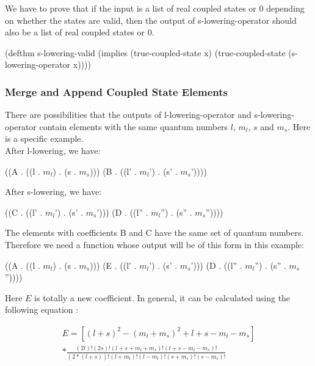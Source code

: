 \documentclass[12pt,journal,compsoc]{IEEEtran}
\begin{document}
We have to prove that if the input is a list of real coupled states or 0 depending on whether the states are valid, then the output of s-lowering-operator should also be a list of real coupled states or 0.

\begin{acl2-lst}
(defthm s-lowering-valid 
 (implies (true-coupled-state x)
  (true-coupled-state (s-lowering-operator x))))
\end{acl2-lst}

\subsubsection{Merge and Append Coupled State Elements}

There are possibilities that the outputs of l-lowering-operator and s-lowering-operator contain elements with the same quantum numbers $l$, $m_l$, $s$ and $m_s$. Here is a specific example.\\

After l-lowering, we have: 

\begin{acl2-lst}
((A . ((l . $m_l$) . (s . $m_s$))) 
(B . ((l' . $m_l$') . (s' . $m_s$'))))
\end{acl2-lst}

After s-lowering, we have:

\begin{acl2-lst}
((C . ((l' . $m_l$') . (s' . $m_s$'))) 
(D . ((l'' . $m_l$'') . (s'' . $m_s$''))))
\end{acl2-lst}

The elements with coefficients B and C have the same set of quantum numbers. Therefore we need a function whose output will be of this form in this example:

\begin{acl2-lst}
((A . ((l . $m_l$) . (s . $m_s$)))
(E . ((l' . $m_l$') . (s' . $m_s$'))) 
(D . ((l'' . $m_l$'') . (s'' . $m_s$''))))
\end{acl2-lst}

Here $E$ is totally a new coefficient. In general, it can be calculated using the following equation \cite{merge-append}:

\begin{equation}
\begin{aligned}
E= [(l+s)^2 - (m_l+m_s)^2 + l+s -m_l -m_s]\\ 
* \frac{(2l)!(2s)!(l+s+m_l+m_s)!(l+s-m_l- m_s)!}{(2*(l+s))! (l+m_l)!(l-m_l)!(s+m_s)!(s-m_s)!}
\end{aligned}
\label{merge}
\end{equation}
\end{document}
